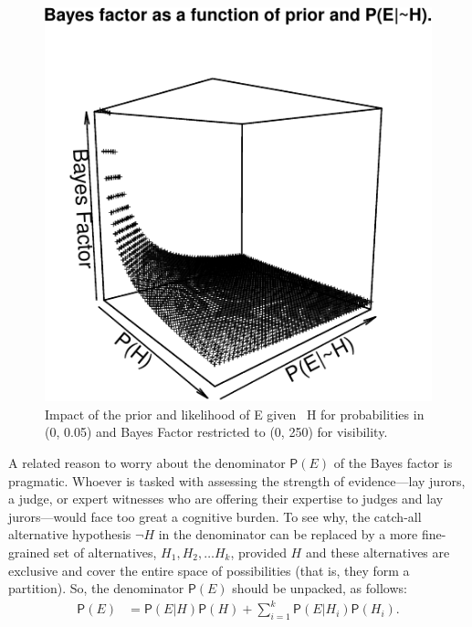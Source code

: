 \documentclass[
  10pt,
  dvipsnames,enabledeprecatedfontcommands]{scrartcl}
\newcommand{\pr}[1]{\mathsf{P}(#1)}
\begin{document}
\begin{figure}


\begin{center}\includegraphics[width=1\linewidth]{lr-chapter4_files/figure-latex/fig-BayesFactorPrior-1} \end{center}
\caption{Impact of the prior and likelihood of E given ~H for probabilities in (0, 0.05) and Bayes Factor restricted to (0, 250) for visibility.}
\label{fig:BayesFactorPrior}
\end{figure}

A related reason to worry about the denominator \(\pr{E}\) of the Bayes
factor is pragmatic. Whoever is tasked with assessing the strength of
evidence---lay jurors, a judge, or expert witnesses who are offering
their expertise to judges and lay jurors---would face too great a
cognitive burden. To see why, the catch-all alternative hypothesis
\(\neg H\) in the denominator can be replaced by a more fine-grained set
of alternatives, \(H_1, H_2, \dots H_k\), provided \(H\) and these
alternatives are exclusive and cover the entire space of possibilities
(that is, they form a partition). So, the denominator \(\pr{E}\) should
be unpacked, as follows: \begin{align} \label{eq:lotpLong}
\pr{E} & = \pr{E\vert H}\pr{H} +\sum_{i=1}^k \pr{E\vert H_i}\pr{H_i}. 
\end{align}
\end{document}
